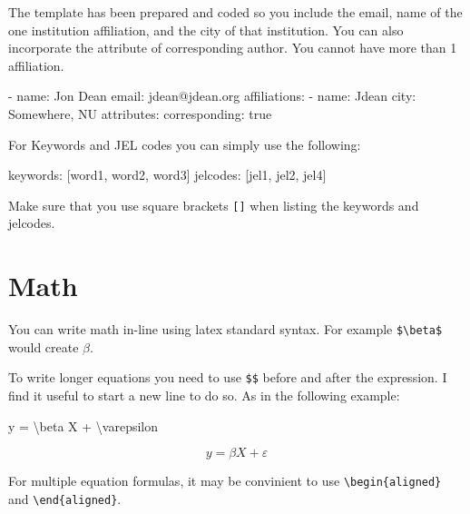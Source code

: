 \documentclass[
  12pt,
]{article}
\newenvironment{Shaded}{\begin{snugshade}}{\end{snugshade}}
\newcommand{\AnnotationTok}[1]{\textcolor[rgb]{0.37,0.37,0.37}{#1}}
\newcommand{\CommentTok}[1]{\textcolor[rgb]{0.37,0.37,0.37}{#1}}
\newcommand{\NormalTok}[1]{\textcolor[rgb]{0.00,0.23,0.31}{#1}}
\newcommand{\SpecialCharTok}[1]{\textcolor[rgb]{0.37,0.37,0.37}{#1}}
\newcommand{\SpecialStringTok}[1]{\textcolor[rgb]{0.13,0.47,0.30}{#1}}
\begin{document}
The template has been prepared and coded so you include the email, name
of the one institution affiliation, and the city of that institution.
You can also incorporate the attribute of corresponding author. You
cannot have more than 1 affiliation.

\begin{Shaded}
\begin{Highlighting}[]
\SpecialStringTok{  {-} }\NormalTok{name: Jon Dean}
\NormalTok{    email: jdean@jdean.org}
\NormalTok{    affiliations: }
\SpecialStringTok{        {-} }\NormalTok{name: Jdean  }
\NormalTok{          city: Somewhere, NU}
\NormalTok{    attributes:}
\NormalTok{        corresponding: true }
\end{Highlighting}
\end{Shaded}

For Keywords and JEL codes you can simply use the following:

\begin{Shaded}
\begin{Highlighting}[]
\AnnotationTok{keywords:}\CommentTok{ [word1, word2, word3]}
\AnnotationTok{jelcodes:}\CommentTok{ [jel1, jel2, jel4]}
\end{Highlighting}
\end{Shaded}

Make sure that you use square brackets \texttt{{[}{]}} when listing the
keywords and jelcodes.

\section{Math}\label{math}

You can write math in-line using latex standard syntax. For example
\texttt{\$\textbackslash{}beta\$} would create \(\beta\).

To write longer equations you need to use \texttt{\$\$} before and after
the expression. I find it useful to start a new line to do so. As in the
following example:

\begin{Shaded}
\begin{Highlighting}[]
\SpecialStringTok{$$y = }\SpecialCharTok{\textbackslash{}beta}\SpecialStringTok{ X + }\SpecialCharTok{\textbackslash{}varepsilon}
\SpecialStringTok{$$}
\end{Highlighting}
\end{Shaded}

\[y = \beta X + \varepsilon
\]

For multiple equation formulas, it may be convinient to use
\texttt{\textbackslash{}begin\{aligned\}} and
\texttt{\textbackslash{}end\{aligned\}}.
\end{document}
